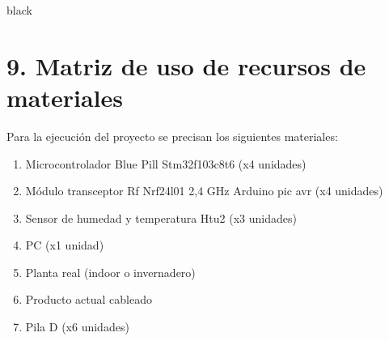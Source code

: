 \documentclass[11pt]{charter}
\begin{document}
\begin{consigna}{black}
\end{consigna}

\section{9. Matriz de uso de recursos de materiales}
\label{sec:recursos}

Para la ejecución del proyecto se precisan los siguientes materiales:

\begin{enumerate}
	\item Microcontrolador Blue Pill Stm32f103c8t6 (x4 unidades)
	\item Módulo transceptor Rf Nrf24l01 2,4 GHz Arduino pic avr (x4 unidades)
	\item Sensor de humedad y temperatura Htu2 (x3 unidades)
	\item PC (x1 unidad)
	\item Planta real (indoor o invernadero)
	\item Producto actual cableado
	\item Pila D (x6 unidades)
\end{enumerate}
\end{document}
